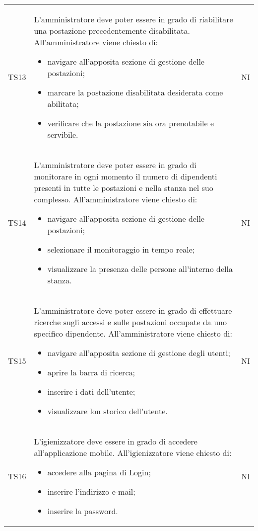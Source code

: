 {\begin{longtable}{ c C{11cm} c }
        TS13&
        L'amministratore deve poter essere in grado di riabilitare una postazione precedentemente disabilitata.\newline
        All'amministratore viene chiesto di:
        \begin{itemize}
            \item navigare all'apposita sezione di gestione delle postazioni;
            \item marcare la postazione disabilitata desiderata come abilitata;
            \item verificare che la postazione sia ora prenotabile e servibile.
        \end{itemize}&
        NI\\

        TS14&
        L'amministratore deve poter essere in grado di monitorare in ogni momento il numero di dipendenti presenti in tutte le postazioni e nella
        stanza nel suo complesso.\newline
        All'amministratore viene chiesto di:
        \begin{itemize}
            \item navigare all'apposita sezione di gestione delle postazioni;
            \item selezionare il monitoraggio in tempo reale;
            \item visualizzare la presenza delle persone all'interno della stanza.
        \end{itemize}&
        NI\\

        TS15&
        L'amministratore deve poter essere in grado di effettuare ricerche sugli accessi e sulle postazioni occupate da uno specifico dipendente.\newline
        All'amministratore viene chiesto di:
        \begin{itemize}
            \item navigare all'apposita sezione di gestione degli utenti;
            \item aprire la barra di ricerca;
            \item inserire i dati dell'utente;
            \item visualizzare lon storico dell'utente.
        \end{itemize}&
        NI\\

        TS16&
        L'igienizzatore deve essere in grado di accedere all'applicazione mobile.\newline
        All'igienizzatore viene chiesto di:
        \begin{itemize}
            \item accedere alla pagina di Login;
            \item inserire l'indirizzo e-mail;
            \item inserire la password.
        \end{itemize}&
        NI\\


\end{longtable}}
